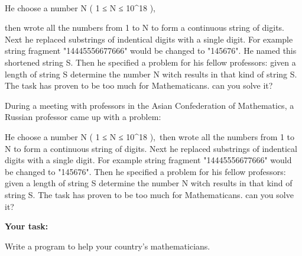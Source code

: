\\





    He choose a number N ( 1 ≤ N ≤ 10^18 ),   

    then wrote all the numbers from 1 to N to form a continuous string of digits. Next he replaced substrings of indentical digits with a single digit. For example string fragment "14445556677666" would be changed to "145676". He named this shortened string S. Then he specified a problem for his fellow professors: given a length of string S determine the number N witch results in that kind of string S. The task has proven to be too much for Mathematicans. can you solve it?   



    During a meeting with professors in the Asian Confederation of Mathematics, a Russian professor came up with a problem:   



    He choose a number N ( 1 ≤ N ≤ 10^18 ), then wrote all the numbers from 1 to N to form a continuous string of digits. Next he replaced substrings of indentical digits with a single digit. For example string fragment "14445556677666" would be changed to "145676". Then he specified a problem for his fellow professors: given a length of string S determine the number N witch results in that kind of string S. The task has proven to be too much for Mathematicans. can you solve it?   



\textbf{     Your task:    }



    Write a program to help your country's mathematicians.   



\